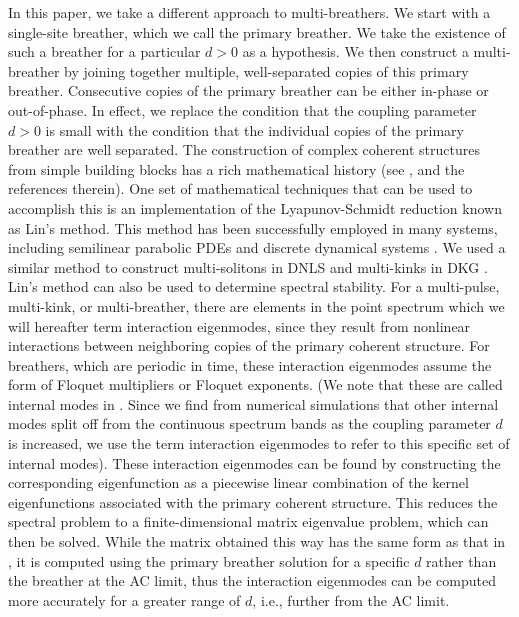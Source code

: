 \documentclass[12pt,reqno]{amsart}
\theoremstyle{definition}
\begin{document}
In this paper, we take a different approach to multi-breathers. We start with a single-site breather, which we call the primary breather. We take the existence of such a breather for a particular $d>0$ as a hypothesis. We then construct a multi-breather by joining together multiple, well-separated copies of this primary breather. Consecutive copies of the primary breather can be either in-phase or out-of-phase. In effect, we replace the condition that the coupling parameter $d>0$ is small with the condition that the individual copies of the primary breather are well separated. 
The construction of complex coherent structures from simple building blocks has a rich mathematical history (see \cite{Sandstede1998}, and the references therein). One set of mathematical techniques that can be used to accomplish this is an implementation of the Lyapunov-Schmidt reduction known as Lin's method. This method has been successfully employed in many systems, including semilinear parabolic PDEs \cite{Sandstede1998,doi:10.1137/0150029} and discrete dynamical systems \cite{Knobloch2000}. We used a similar method to construct multi-solitons in DNLS \cite{Parker2020} and multi-kinks in DKG \cite{Parker2021}. Lin's method can also be used to determine spectral stability. For a multi-pulse, multi-kink, or multi-breather, there are elements in the point spectrum which we will 
hereafter term interaction eigenmodes, since they result from nonlinear interactions between neighboring copies of the primary coherent structure. For breathers, which are periodic in time, these interaction eigenmodes assume the form of Floquet multipliers or Floquet exponents.
(We note that these are called internal modes in \cite{cuevas-maraver2016}. Since we find from numerical simulations that other internal modes split off from the continuous spectrum bands as the coupling parameter $d$ is increased, we use the term interaction eigenmodes to refer to this specific set of internal modes).
These interaction eigenmodes can be found by constructing the corresponding eigenfunction as a piecewise linear combination of the kernel eigenfunctions associated with the primary coherent structure. This reduces the spectral problem to a finite-dimensional matrix eigenvalue problem, which can then be solved. While the matrix obtained this way has the same form as that in \cites{Pelinovsky2012,cuevas-maraver2016}, it is computed using the primary breather solution for a specific $d$ rather than the breather at the AC limit, thus the interaction eigenmodes can be computed more accurately for a greater range of $d$, i.e., further from the AC limit.
\end{document}

